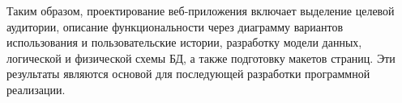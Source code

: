 Таким образом, проектирование веб-приложения включает выделение целевой аудитории, описание функциональности через диаграмму вариантов использования и пользовательские истории, разработку модели данных, логической и физической схемы БД, а также подготовку макетов страниц. Эти результаты являются основой для последующей разработки программной реализации.
